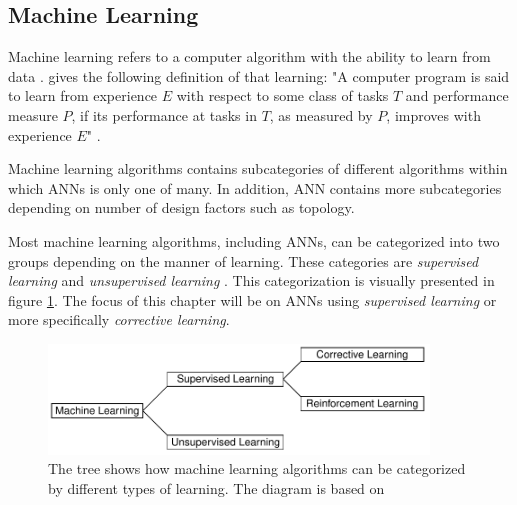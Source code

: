 \documentclass[../main.tex]{subfiles}
\begin{document}

\subsection{Machine Learning}
Machine learning refers to a computer algorithm with the ability to learn from data \cite{Goodfellow2016}. 
\textcite{Mitchell1997} gives the following definition of that learning: "A computer program is said to learn from experience $E$ with respect to some class of tasks $T$ and performance measure $P$, if its performance at tasks in $T$, as measured by $P$, improves with experience $E$" \parencite[2]{Mitchell1997}.

Machine learning algorithms contains subcategories of different algorithms within which \acp{ANN} is only one of many.
In addition, \ac{ANN} contains more subcategories depending on number of design factors such as topology.

Most machine learning algorithms, including \acp{ANN}, can be categorized into two groups depending on the manner of learning.
These categories are \textit{supervised learning} and \textit{unsupervised learning} \cite{Goodfellow2016}.
This categorization is visually presented in figure \ref{fig:types-of-learning}.
The focus of this chapter will be on \acp{ANN} using \textit{supervised learning} or more specifically \textit{corrective learning}.

\begin{figure}[ht]
    \centering
    \includegraphics[width=0.9\textwidth]{img/types-of-learning-diagram.pdf}
    \caption{The tree shows how machine learning algorithms can be categorized by different types of learning. The diagram is based on \cite[Fig. 4.3]{Rojas1996a}}
    \label{fig:types-of-learning}
\end{figure}
\end{document}
